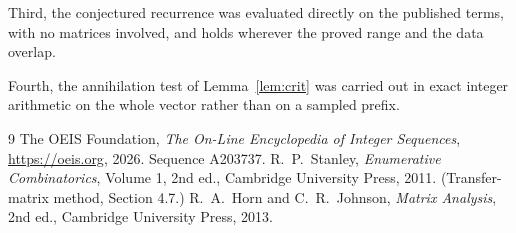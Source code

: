 \documentclass[11pt,a4paper]{article}
\theoremstyle{plain}
\theoremstyle{definition}
\begin{document}
Third, the conjectured recurrence was evaluated directly on the published terms, with no
matrices involved, and holds wherever the proved range and the data overlap.

Fourth, the annihilation test of Lemma~\ref{lem:crit} was carried out in exact integer
arithmetic on the whole vector rather than on a sampled prefix.

\begin{thebibliography}{9}
 The OEIS Foundation, \emph{The On-Line Encyclopedia of Integer
Sequences}, \url{https://oeis.org}, 2026. Sequence A203737.
 R.~P.~Stanley, \emph{Enumerative Combinatorics}, Volume 1, 2nd ed.,
Cambridge University Press, 2011. (Transfer-matrix method, Section 4.7.)
 R.~A.~Horn and C.~R.~Johnson, \emph{Matrix Analysis}, 2nd ed., Cambridge
University Press, 2013.
\end{thebibliography}
\end{document}
